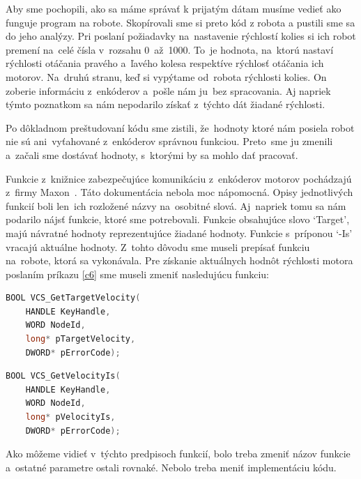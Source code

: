 Aby sme pochopili, ako sa máme správať k prijatým dátam musíme vedieť ako funguje program na robote.
Skopírovali sme si preto kód z robota a pustili sme sa do jeho analýzy. Pri poslaní požiadavky
na~nastavenie rýchlostí kolies si ich robot premení na~celé čísla v~rozsahu 0~až~1000. To~je hodnota, na~ktorú nastaví
rýchlosti otáčania pravého a~ľavého kolesa respektíve rýchlosť otáčania ich motorov. Na~druhú stranu,
keď si vypýtame od~robota rýchlosti kolies. On zoberie informáciu z~enkóderov a~pošle nám ju~bez spracovania. Aj napriek týmto poznatkom sa nám
nepodarilo získať z~týchto dát žiadané rýchlosti.

Po dôkladnom preštudovaní kódu sme zistili, že~hodnoty ktoré nám posiela robot nie sú ani~vyťahované z~enkóderov správnou funkciou. Preto~sme ju
zmenili a~začali sme dostávať hodnoty, s~ktorými by sa mohlo dať pracovať.

Funkcie z~knižnice zabezpečujúce komunikáciu z~enkóderov motorov pochádzajú z~firmy Maxon~\cite{EPOSdoc}. Táto dokumentácia nebola moc nápomocná.
Opisy jednotlivých funkcií boli len~ich rozložené názvy na~osobitné slová. Aj~napriek tomu sa nám podarilo nájsť funkcie, ktoré sme potrebovali.
Funkcie obsahujúce slovo `Target', majú návratné hodnoty reprezentujúce žiadané hodnoty. Funkcie s~príponou
`-Is' vracajú aktuálne hodnoty. Z~tohto dôvodu sme museli prepísať funkciu na~robote, ktorá sa vykonávala.
Pre získanie aktuálnych hodnôt rýchlosti motora poslaním príkazu \ref{c6} sme museli zmeniť nasledujúcu funkciu:


\label{VelocityIs}
\begin{lstlisting}[language=C++]
BOOL VCS_GetTargetVelocity(
	HANDLE KeyHandle,
	WORD NodeId,
	long* pTargetVelocity,
	DWORD* pErrorCode);
\end{lstlisting}

\begin{lstlisting}[language=C++]
BOOL VCS_GetVelocityIs(
	HANDLE KeyHandle,
	WORD NodeId,
	long* pVelocityIs,
	DWORD* pErrorCode);
\end{lstlisting}

\noindent Ako môžeme vidieť v~týchto predpisoch funkcií, bolo treba zmeniť názov funkcie a~ostatné parametre ostali rovnaké.
Nebolo treba meniť implementáciu kódu.

